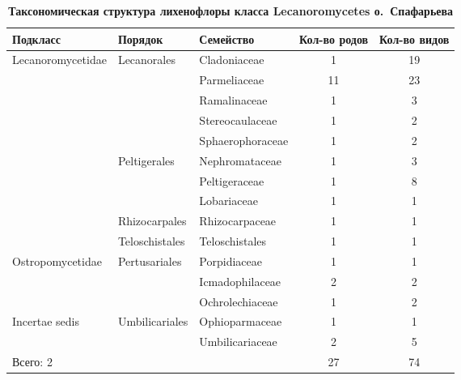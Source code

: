 \begin{table}[h!]
\caption*{\textbf{Таксономическая структура лихенофлоры класса Lecanoromycetes о.~Спафарьева}}
\label{tab:zhelydeva}
\begin{center}


\begin{tabular}{lllcc}
   \toprule
Подкласс          & Порядок                  & Семейство                 &  \parbox[c][4em][c]{0.1\textwidth}{ \centering Кол-во родов} & \parbox[c][4em][c]{0.1\textwidth}{ \centering Кол-во видов} \\
 \midrule
Lecanoromycetidae & Lecanorales              & Cladoniaceae     & 1                & 19               \\
                  &                          & Parmeliaceae    & 11                & 23               \\
                  &                          & Ramalinaceae     & 1                & 3                \\
                  &                          & Stereocaulaceae  & 1                & 2                \\
                  &                          & Sphaerophoraceae & 1                & 2                \\
                  & Peltigerales             & Nephromataceae  & 1                & 3                \\
                  &                          & Peltigeraceae    & 1                & 8                \\
                  &                          & Lobariaceae      & 1                & 1                \\
                  & Rhizocarpales            & Rhizocarpaceae   & 1                & 1                \\
                  & Teloschistales           & Teloschistales   & 1                & 1                \\
 \midrule
Ostropomycetidae  & Pertusariales            & Porpidiaceae     & 1                & 1                \\
                  &                          & Icmadophilaceae  & 2                 & 2                \\
                  &                          & Ochrolechiaceae  & 1                & 2                \\
 \midrule
Incertae sedis    & Umbilicariales           & Ophioparmaceae   & 1                & 1                \\
                  &                          & Umbilicariaceae  & 2                & 5                \\
 \midrule
Всего: 2          & \quad\quad{}                        & \quad\quad{}                        & 27               & 74\\
\bottomrule

\end{tabular}
\end{center}
\end{table}
